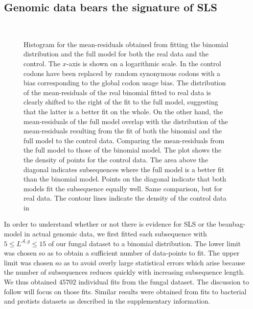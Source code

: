 \documentclass[a4paper,10pt]{paper}%
\begin{document}
\subsection{Genomic data bears the signature of SLS}
%
%
\begin{figure}
\centering
{}\\
\caption{ \protect{}  Histogram for the mean-residuals  obtained from fitting the  binomial distribution and the full model for both the real data and the control. The $x$-axis  is shown on a logarithmic scale.  In the  control codons have been replaced by random synonymous codons with a bias corresponding to the global codon usage bias.  The distribution of the mean-residuals of the real binomial fitted to real data  is clearly shifted to the right of the fit to the full model, suggesting that the latter is a better fit on the whole. On the other hand, the  mean-residuals of the full model overlap  with the distribution of the mean-residuals resulting from the fit  of both the binomial and the full model to the control data.  \protect{} Comparing the mean-residuals from the full model to those of the binomial model. The plot shows the the density of points for the control data. The area above  the diagonal indicates subsequences where the full model is a better fit than the binomial model. Points on the diagonal indicate that both models fit the subsequence equally well. \protect{} Same comparison, but for real data. The contour lines indicate the density of the  control data in \protect{} }
\label{histogram}
\end{figure}
%
%  
In order to understand  whether or not there is evidence for SLS or the beanbag-model in actual genomic data, we first fitted  each subsequence  with $5\leq L^{\mathcal A,g}\leq 15$ of our fungal dataset  to a binomial distribution.  The lower limit was chosen so as to obtain a sufficient number of data-points to fit. The upper limit was chosen so as to avoid overly large statistical errors which arise because the number of subsequences reduces quickly  with increasing subsequence length.  We thus  obtained   $45702$ individual fits from the fungal dataset. The discussion to follow will focus on those fits. Similar results were obtained from fits to bacterial and protists datasets as described in the supplementary information.  
\end{document}
